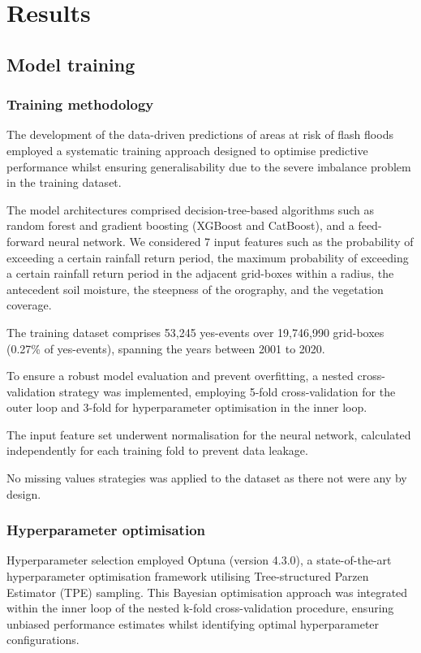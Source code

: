 \section{Results}


\subsection{Model training}

\subsubsection{Training methodology}

The development of the data-driven predictions of areas at risk of flash floods employed a systematic training approach designed to optimise predictive performance whilst ensuring generalisability due to the severe imbalance problem in the training dataset. 

The model architectures comprised decision-tree-based algorithms such as random forest and gradient boosting (XGBoost and CatBoost), and a feed-forward neural network. We considered 7 input features such as the probability of exceeding a certain rainfall return period, the maximum probability of exceeding a certain rainfall return period in the adjacent grid-boxes within a radius, the antecedent soil moisture, the steepness of the orography, and the vegetation coverage. 

The training dataset comprises 53,245 yes-events over 19,746,990 grid-boxes (0.27\% of yes-events), spanning the years between 2001 to 2020. 

To ensure a robust model evaluation and prevent overfitting, a nested cross-validation strategy was implemented, employing 5-fold cross-validation for the outer loop and 3-fold for hyperparameter optimisation in the inner loop. 

The input feature set underwent normalisation for the neural network, calculated independently for each training fold to prevent data leakage.

No missing values strategies was applied to the dataset as there not were any by design.


\subsubsection{Hyperparameter optimisation}

Hyperparameter selection employed Optuna (version 4.3.0), a state-of-the-art hyperparameter optimisation framework utilising Tree-structured Parzen Estimator (TPE) sampling. This Bayesian optimisation approach was integrated within the inner loop of the nested k-fold cross-validation procedure, ensuring unbiased performance estimates whilst identifying optimal hyperparameter configurations.

